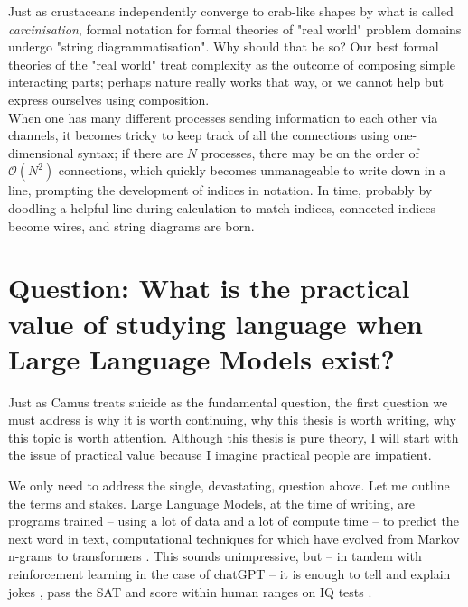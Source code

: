 Just as crustaceans independently converge to crab-like shapes by what is called \emph{carcinisation}, formal notation for formal theories of "real world" problem domains undergo "string diagrammatisation". Why should that be so? Our best formal theories of the "real world" treat complexity as the outcome of composing simple interacting parts; perhaps nature really works that way, or we cannot help but express ourselves using composition.\\

When one has many different processes sending information to each other via channels, it becomes tricky to keep track of all the connections using one-dimensional syntax; if there are $N$ processes, there may be on the order of $\mathcal{O}(N^2)$ connections, which quickly becomes unmanageable to write down in a line, prompting the development of indices in notation. In time, probably by doodling a helpful line during calculation to match indices, connected indices become wires, and string diagrams are born.

\section{\textbf{Question:} What is the practical value of studying language when Large Language Models exist?}

Just as Camus treats suicide as the fundamental question, the first question we must address is why it is worth continuing, why this thesis is worth writing, why this topic is worth attention. Although this thesis is pure theory, I will start with the issue of practical value because I imagine practical people are impatient.

We only need to address the single, devastating, question above. Let me outline the terms and stakes. Large Language Models, at the time of writing, are programs trained -- using a lot of data and a lot of compute time -- to predict the next word in text, computational techniques for which have evolved from Markov n-grams to transformers \citep{vaswani_attention_2017}. This sounds unimpressive, but -- in tandem with reinforcement learning in the case of chatGPT \citep{openai_chatgpt_2022} -- it is enough to tell and explain jokes \citep{bastian_google_2022}, pass the SAT \citep{teddy_teddynpc_i_2022} and score within human ranges on IQ tests \citep{thompson_gpt-35_2022}.\\

